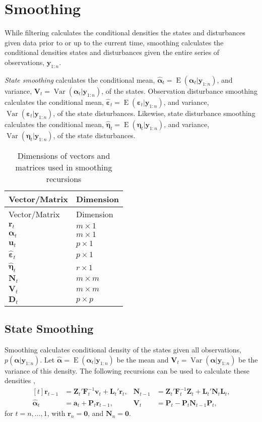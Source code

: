 \documentclass[]{book}
\DeclareMathOperator{\E}{E}
\DeclareMathOperator{\Var}{Var}
\newcommand{\mat}[1]{\boldsymbol{#1}}
\renewcommand{\vec}[1]{\boldsymbol{#1}}
\renewcommand{\T}{'}
\begin{document}
\section{Smoothing}\label{smoothing}

While filtering calculates the conditional densities the states and
disturbances given data prior to or up to the current time, smoothing
calculates the conditional densities states and disturbances given the
entire series of observations, \(\vec{y}_{1:n}\).

\emph{State smoothing} calculates the conditional mean,
\(\hat{\vec{\alpha}}_t = \E(\vec{\alpha}_t | \vec{y}_{1:n})\), and
variance, \(\mat{V}_t = \Var(\vec{\alpha}_t | \vec{y}_{1:n})\), of the
states. Observation disturbance smoothing calculates the conditional
mean,
\(\hat{\vec{\varepsilon}}_t = \E(\vec{\varepsilon}_t | \vec{y}_{1:n})\),
and variance, \(\Var(\vec{\varepsilon}_t | \vec{y}_{1:n})\), of the
state disturbances. Likewise, state disturbance smoothing calculates the
conditional mean,
\(\hat{\vec{\eta}}_t = \E(\vec{\eta}_t | \vec{y}_{1:n})\), and variance,
\(\Var(\vec{\eta}_t | \vec{y}_{1:n})\), of the state disturbances.

\begin{longtable}[]{@{}ll@{}}
\caption{Dimensions of vectors and matrices used in smoothing
recursions}\tabularnewline
\toprule
Vector/Matrix & Dimension\tabularnewline
\midrule
\endfirsthead
\toprule
Vector/Matrix & Dimension\tabularnewline
\midrule
\endhead
\(\vec{r}_t\) & \(m \times 1\)\tabularnewline
\(\vec{\vec{\alpha}}_t\) & \(m \times 1\)\tabularnewline
\(\vec{u}_t\) & \(p \times 1\)\tabularnewline
\(\hat{\vec{\varepsilon}}_t\) & \(p \times 1\)\tabularnewline
\(\hat{\vec{\eta}}_t\) & \(r \times 1\)\tabularnewline
\(\mat{N}_t\) & \(m \times m\)\tabularnewline
\(\mat{V}_t\) & \(m \times m\)\tabularnewline
\(\mat{D}_t\) & \(p \times p\)\tabularnewline
\bottomrule
\end{longtable}

\subsection{State Smoothing}\label{state-smoothing}

Smoothing calculates conditional density of the states given all
observations, \(p(\vec{\alpha} | \vec{y}_{1:n})\). Let
\(\hat{\vec{\alpha}} = \E(\vec{\alpha}_t | \vec{y}_{1:n})\) be the mean
and \(\mat{V}_t = \Var(\vec{\alpha} | \vec{y}_{1:n})\) be the variance
of this density. The following recursions can be used to calculate these
densities \autocite[Sec 4.4.4]{DurbinKoopman2012}, \[
\begin{aligned}[t]
\vec{r}_{t - 1} &= \mat{Z}_t\T \mat{F}_t^{-1} \vec{v}_t + \mat{L}_t\T \vec{r}_t , &
\mat{N}_{t - 1} &= \mat{Z}_t\T \mat{F}_t^{-1} \mat{Z}_t + \mat{L}_t\T \mat{N}_t \mat{L}_t, \\
\hat{\vec{\alpha}}_t &= \vec{a}_t + \mat{P}_t \vec{r}_{t - 1} , &
\mat{V}_t &= \mat{P}_t - \mat{P}_t \mat{N}_{t - 1} \mat{P}_t ,
\end{aligned}
\] for \(t = n, \dots, 1\), with \(\vec{r}_n = \vec{0}\), and
\(\mat{N}_n = \mat{0}\).
\end{document}
